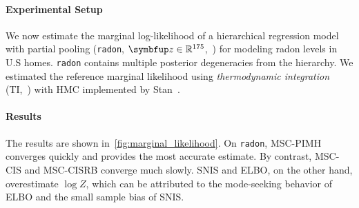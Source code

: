 \paragraph{Experimental Setup}
We now estimate the marginal log-likelihood of a hierarchical regression model with partial pooling (\texttt{radon}, \(\vz \in \mathbb{R}^{175}\),~\citealt{gelman_data_2007}) for modeling radon levels in U.S homes.
\texttt{radon} contains multiple posterior degeneracies from the hierarchy.
We estimated the reference marginal likelihood using \textit{thermodynamic integration} (TI,~\citealt{gelman_simulating_1998, neal_annealed_2001, lartillot_computing_2006}) with HMC implemented by Stan~\citep{carpenter_stan_2017, betancourt_conceptual_2017}.

  \vspace{-0.05in}
\paragraph{Results}
The results are shown in~\cref{fig:marginal_likelihood}.
On \texttt{radon}, MSC-PIMH converges quickly and provides the most accurate estimate.
By contrast, MSC-CIS and MSC-CISRB converge much slowly.
SNIS and ELBO, on the other hand, overestimate \(\log Z\), which can be attributed to the mode-seeking behavior of ELBO and the small sample bias of SNIS.


